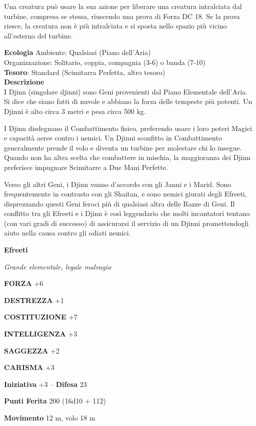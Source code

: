 \begin{multicols}{2}
Una creatura può usare la sua azione per liberare una creatura intralciata dal turbine, compresa se stessa, riuscendo una prova di Forza DC 18. Se la prova riesce, la creatura non è più intralciata e si sposta nello spazio più vicino all'esterno del turbine.

\textbf{Ecologia}
Ambiente: Qualsiasi (Piano dell'Aria)\\
Organizzazione: Solitario, coppia, compagnia (3-6) o banda (7-10)\\
\textbf{Tesoro}: Standard (Scimitarra Perfetta, altro tesoro)\\
\textbf{Descrizione}\\
I Djinn (singolare djinni) sono Geni provenienti dal Piano Elementale dell'Aria. Si dice che siano fatti di nuvole e abbiano la forza delle tempeste più potenti. Un Djinni è alto circa 3 metri e pesa circa 500 kg.

I Djinn disdegnano il Combattimento fisico, preferendo usare i loro poteri Magici e capacità aeree contro i nemici. Un Djinni sconfitto in Combattimento generalmente prende il volo e diventa un turbine per molestare chi lo insegue. Quando non ha altra scelta che combattere in mischia, la maggioranza dei Djinn preferisce impugnare Scimitarre a Due Mani Perfette.

Verso gli altri Geni, i Djinn vanno d'accordo con gli Janni e i Marid. Sono frequentemente in contrasto con gli Shaitan, e sono nemici giurati degli Efreeti, disprezzando questi Geni feroci più di qualsiasi altra delle Razze di Geni. Il conflitto tra gli Efreeti e i Djinn è così leggendario che molti incantatori tentano (con vari gradi di successo) di assicurarsi il servizio di un Djinni promettendogli aiuto nella causa contro gli odiati nemici.


\medskip{}\textbf{Efreeti}

\textit{Grande elementale, legale malvagio}

\textbf{FORZA} +6

\textbf{DESTREZZA} +1

\textbf{COSTITUZIONE} +7

\textbf{INTELLIGENZA} +3

\textbf{SAGGEZZA} +2

\textbf{CARISMA} +3

\textbf{Iniziativa} +3 -- \textbf{Difesa} 23

\textbf{Punti Ferita} 200 (16d10 + 112)

\textbf{Movimento} 12 m, volo 18 m


\end{multicols}
